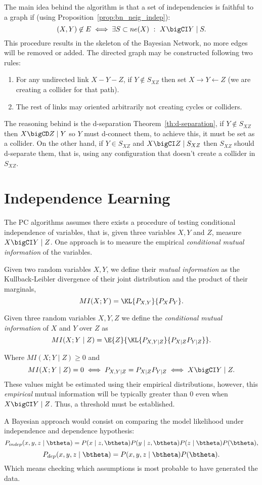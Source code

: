 The main idea behind the algorithm is that a set of independencies is faithful to a graph if (using Proposition~\ref{prop:bn_neig_indep}):
\[
  (X,Y) \not \in E \iff \exists S \subset ne(X) \ : \ X \bigCI Y \mid S.
\]
This procedure results in the skeleton of the Bayesian Network, no more edges will be removed or added. The directed graph may be constructed following two rules:
\begin{enumerate}
  \item For any undirected link \(X - Y - Z\), if \(Y \notin S_{XZ}\) then set
    \(X \to Y \leftarrow Z\) (we are creating a collider for that path).
  \item The rest of links may oriented arbitrarily not
creating cycles or colliders.
\end{enumerate}
The reasoning behind is the d-separation Theorem~\ref{th:d-separation},  if \(Y \notin S_{XZ}\) then \(X \bigCD Z \mid Y\) so \(Y\) must d-connect them, to achieve this, it must be set as a collider. On the other hand, if \(Y \in S_{XZ}\) and
\(X \bigCI Z \mid S_{XZ}\) then \(S_{XZ}\) should d-separate them, that is,
using any configuration that doesn't create a collider in \(S_{XZ}\).

\section{Independence Learning}

The PC algorithms assumes there exists a procedure of testing conditional independence of variables, that is, given three variables \(X, Y\) and \( Z \),  measure \(X \bigCI Y \mid Z\). One approach is to measure the empirical \emph{conditional mutual information} of the variables.

\begin{definition}
  Given two random variables \(X, Y\), we define their \emph{mutual information} as the Kullback-Leibler divergence of their joint distribution and the product of their marginals,
  \[
    MI(X;Y) = \KL{P_{X,Y}}{P_{X}P_{Y}}.
  \]
\end{definition}

\begin{definition}
  Given three random variables \(X, Y, Z\) we define the \emph{conditional mutual information} of \(X\) and \(Y\) over \(Z\) as
  \[
    MI(X;Y\mid Z) = \E{Z}{\KL{P_{X,Y \mid Z}}{P_{X\mid Z} P_{Y \mid Z}}}.
  \]
\end{definition}
Where \(MI(X;Y \mid Z) \geq 0\) and
\[
MI(X;Y \mid Z) = 0 \iff P_{X,Y \mid Z} = P_{X\mid Z} P_{Y \mid Z} \iff X\bigCI Y \mid Z.
\]
These values might be estimated using their empirical distributions, however, this \emph{empirical} mutual information will be typically greater than \(0\) even when \(X\bigCI Y \mid Z\). Thus, a threshold must be established.

A Bayesian approach would consist on comparing the model likelihood under independence and dependence hypothesis:
\[
  P_{indep}(x,y,z \mid \btheta) = P(x\mid z, \btheta)P(y \mid z, \btheta)P(z \mid \btheta)P(\btheta),
\]
\[
P_{dep}(x,y,z \mid \btheta) = P(x,y,z \mid \btheta)P(\btheta).
\]
Which means checking which assumptions is most probable to have generated the data.

